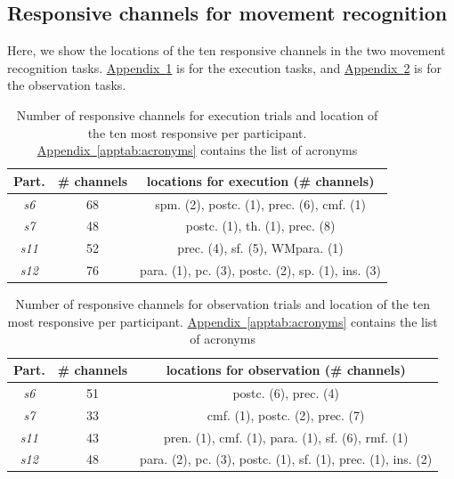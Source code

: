 \documentclass[10pt,conference,compsocconf]{IEEEtran}
\newcommand{\aref}[1]{\hyperref[#1]{Appendix~\ref*{#1}}}
\begin{document}
\subsection{Responsive channels for movement recognition}
\label{subsec:respchannelmov}
Here, we show the locations of the ten responsive channels in the two movement recognition tasks. \aref{apptab:exmovchannellocations} is for the execution tasks, and \aref{apptab:obsmovchannellocations} is for the observation tasks.

\begin{table}[h!]
    \centering
    \begin{tabular}{| c | c | c |}
        \hline
        Part. & \# channels & locations for execution (\# channels) \\
        \hline
        \textit{s6} & 68 & spm. (2), postc. (1), prec. (6), cmf. (1) \\
        \hline
        \textit{s7} & 48 & postc. (1), th. (1), prec. (8)\\
        \hline
        \textit{s11} & 52 & prec. (4), sf. (5), WMpara. (1)\\
        \hline
        \textit{s12} & 76 & para. (1), pc. (3), postc. (2), sp. (1), ins. (3)\\
        \hline
    \end{tabular}
    \caption{Number of responsive channels for execution trials and location of the ten most responsive per participant. \aref{apptab:acronyms} contains the list of acronyms}
    \label{apptab:exmovchannellocations}
\end{table}

\begin{table}[h!]
    \centering
    \begin{tabular}{| c | c | c |}
        \hline
        Part. & \# channels & locations for observation (\# channels) \\
        \hline
        \textit{s6} & 51 & postc. (6), prec. (4)\\
        \hline
        \textit{s7} & 33 & cmf. (1), postc. (2), prec. (7) \\
        \hline
        \textit{s11} & 43 & pren. (1), cmf. (1), para. (1), sf. (6), rmf. (1)\\
        \hline
        \textit{s12} & 48 & para. (2), pc. (3), postc. (1), sf. (1), prec. (1), ins. (2)\\
        \hline
    \end{tabular}
    \caption{Number of responsive channels for observation trials and location of the ten most responsive per participant. \aref{apptab:acronyms} contains the list of acronyms}
    \label{apptab:obsmovchannellocations}
\end{table}
\end{document}
